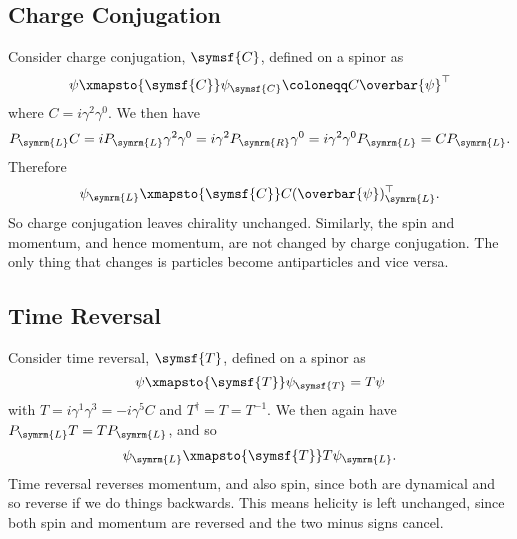 \documentclass[fleqn]{NotesClass}
\newcommand{\diracadjoint}[1]{\overbar{#1}}
\newcommand{\hermit}{\dagger}
\newcommand{\chargeConjugation}{\symsf{C}}
\newcommand{\timeReversal}{\symsf{T}}
\newcommand{\Left}{\symrm{L}}
\newcommand{\Right}{\symrm{R}}
\newcommand{\trans}{\top}
\begin{document}
    \subsection{Charge Conjugation}
    Consider charge conjugation, \(\chargeConjugation\), defined on a spinor as
    \begin{equation}
         \psi \xmapsto{\chargeConjugation} \psi_{\chargeConjugation} \coloneqq C \diracadjoint{\psi}^\trans
    \end{equation}
    where \(C = i \gamma^2 \gamma^0\).
    We then have
    \begin{equation}
        P_{\Left}C = iP_{\Left}\gamma^2\gamma^0 = i\gamma^2P_{\Right}\gamma^0 = i\gamma^2\gamma^0P_{\Left} = CP_{\Left}.
    \end{equation}
    Therefore
    \begin{equation}
        \psi_{\Left} \xmapsto{\chargeConjugation} C(\diracadjoint{\psi})_{\Left}^{\trans}.
    \end{equation}
    So charge conjugation leaves chirality unchanged.
    Similarly, the spin and momentum, and hence momentum, are not changed by charge conjugation.
    The only thing that changes is particles become antiparticles and vice versa.
    
    \subsection{Time Reversal}
    Consider time reversal, \(\timeReversal\), defined on a spinor as
    \begin{equation}
        \psi \xmapsto{\timeReversal} \psi_{\timeReversal} = T\psi
    \end{equation}
    with \(T = i\gamma^1\gamma^3 = -i\gamma^5C\) and \(T^{\hermit} = T = T^{-1}\).
    We then again have \(P_{\Left}T = TP_{\Left}\), and so
    \begin{equation}
        \psi_{\Left} \xmapsto{\timeReversal} T\psi_{\Left}.
    \end{equation}
    Time reversal reverses momentum, and also spin, since both are dynamical and so reverse if we do things backwards.
    This means helicity is left unchanged, since both spin and momentum are reversed and the two minus signs cancel.
    
%        
    
    \backmatter
    \printindex
\end{document}
